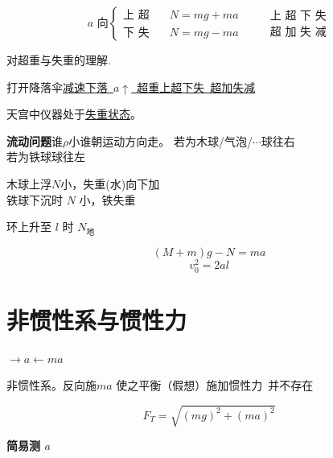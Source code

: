 \[ a\text{ 向}\left\{\begin{array}{ll}\text{上 超}&\quad N=mg+ma\\ \text{下 失}&\quad N=mg-ma\end{array}\right.\qquad \begin{array}{l}\text{上 超 下 失}\\ \text{超 加 失 减}\end{array} \]

对超重与失重的理解.

打开降落伞\underline{减速下落\ $a\uparrow$\ 超重}\qquad \underline{上超下失\ 超加失减}

天宫中仪器处于\underline{失重状态}。

\textbf{流动问题}\quad 谁$\rho$小谁朝运动方向走。
\noindent 若为木球/气泡/$\cdots$\quad 球往右 \\
若为铁球\quad 球往左

\noindent 木球上浮\quad $N$小，失重(水)向下加
\\
铁球下沉时 $N$ 小，铁失重

\begin{problem}
环上升至 $l$ 时 $N_{\text{地}}$
\begin{solution}
\[ (M+m)g-N=ma \]
\[ v_0^2=2al \]
\end{solution}
\end{problem}


\section{非惯性系与惯性力}
\noindent $\to a$\quad $\leftarrow ma$

\noindent 非惯性系。反向施$ma$ 使之平衡（假想）\quad 施加惯性力\ 并不存在

\[ F_T=\sqrt{(mg)^2+(ma)^2} \]

\textbf{简易测 $a$}


